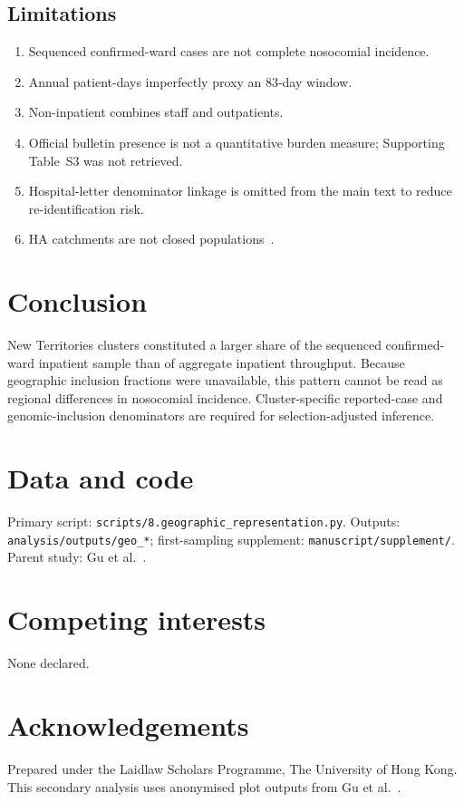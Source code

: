\documentclass[11pt]{article}
\begin{document}
\subsection{Limitations}
\begin{enumerate}
  \item Sequenced confirmed-ward cases are not complete nosocomial incidence.
  \item Annual patient-days imperfectly proxy an 83-day window.
  \item Non-inpatient combines staff and outpatients.
  \item Official bulletin presence is not a quantitative burden measure; Supporting Table~S3 was not retrieved.
  \item Hospital-letter denominator linkage is omitted from the main text to reduce re-identification risk.
  \item HA catchments are not closed populations~\cite{legco2017}.
\end{enumerate}

\section{Conclusion}
New Territories clusters constituted a larger share of the sequenced confirmed-ward inpatient sample than of aggregate inpatient throughput.
Because geographic inclusion fractions were unavailable, this pattern cannot be read as regional differences in nosocomial incidence.
Cluster-specific reported-case and genomic-inclusion denominators are required for selection-adjusted inference.

\section*{Data and code}
Primary script: \texttt{scripts/8.geographic\_representation.py}.
Outputs: \texttt{analysis/outputs/geo\_*}; first-sampling supplement: \texttt{manuscript/supplement/}.
Parent study: Gu et al.~\cite{gu2026hai}.

\section*{Competing interests}
None declared.

\section*{Acknowledgements}
Prepared under the Laidlaw Scholars Programme, The University of Hong Kong.
This secondary analysis uses anonymised plot outputs from Gu et al.~\cite{gu2026hai}.



\end{document}
